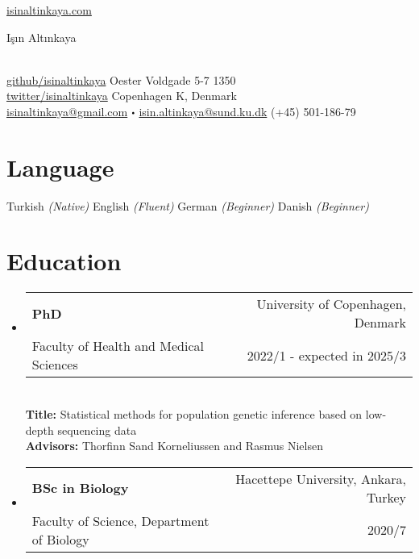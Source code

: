 \documentclass[letterpaper,10.5pt]{article}
\makeatletter
\newcommand\sbullet[1][.5]{\mathbin{\vcenter{\hbox{\scalebox{#1}{$\bullet$}}}}}
\newcommand{\resumeSubheading}[5]{
  \vspace{-1pt}\item
    \begin{tabular*}{0.97\textwidth}{l@{\extracolsep{\fill}}r}
      \textbf{#1} & #2 \\
      {\small#3} & {\small #4} \\
    \end{tabular*}\vspace{3pt} \\
    #5
}
\newcommand{\resumeSubHeadingListStart}{\begin{itemize}[leftmargin=*]}
\newcommand{\resumeSubHeadingListEnd}{\end{itemize}}
\makeatother
\begin{document}

\href{http://isinaltinkaya.com/}{isinaltinkaya.com} \hfill \begin{Huge}I\c{s}{\i}n Alt{\i}nkaya \end{Huge} \\
\href {https://github.com/isinaltinkaya}{github/isinaltinkaya} \hfill Oester Voldgade 5-7 1350 \\
\href {https://twitter.com/isinaltinkaya}{twitter/isinaltinkaya}  \hfill Copenhagen K, Denmark \\
\href{mailto:isinaltinkaya@gmail.com}{isinaltinkaya@gmail.com} $\sbullet[.5]$ \href{mailto:isin.altinkaya@sund.ku.dk}{isin.altinkaya@sund.ku.dk} \hfill (+45) 501-186-79 \\



 
 
\section{Language}
Turkish \textit{(Native)} \hfill English \textit{(Fluent)} \hfill German \textit{(Beginner)} \hfill Danish \textit{(Beginner)} 


\section{Education}
  \resumeSubHeadingListStart
    \resumeSubheading
      {PhD} {University of Copenhagen, Denmark}
      {Faculty of Health and Medical Sciences} {2022/1 - expected in 2025/3}
    \quad \textbf{Title:} Statistical methods for population genetic inference based on low-depth sequencing data \\
    \quad \textbf{Advisors:} Thorfinn Sand Korneliussen and Rasmus Nielsen
    \resumeSubheading
      {BSc in Biology} {Hacettepe University, Ankara, Turkey}
      {Faculty of Science, Department of Biology} {2020/7}
  \resumeSubHeadingListEnd
\end{document}
